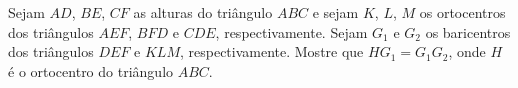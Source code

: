 Sejam $AD$, $BE$, $CF$ as alturas do triângulo $ABC$ e sejam $K$, $L$, $M$ os ortocentros dos triângulos $AEF$, $BFD$ e $CDE$, respectivamente. Sejam $G_1$ e $G_2$ os baricentros dos triângulos $DEF$ e $KLM$, respectivamente. Mostre que $HG_1 = G_1G_2$, onde $H$ é o ortocentro do triângulo $ABC$.
